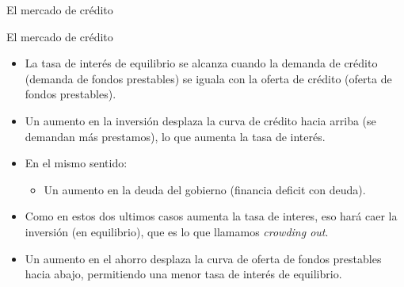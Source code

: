 \documentclass{beamer}
\begin{document}
\begin{frame}{El mercado de crédito}
    \begin{center}
        \begin{figure}[H]
        \renewcommand{\figurename}{Figure}
            \begin{center}
            \end{center}
        \end{figure}
    \end{center}  
\end{frame}

\begin{frame}{El mercado de crédito}
    \begin{itemize}
        \item La tasa de interés de equilibrio se alcanza cuando la demanda de crédito (demanda de fondos prestables) se iguala con la oferta de crédito (oferta de fondos prestables).
        \item Un aumento en la inversión desplaza la curva de crédito hacia arriba (se demandan más prestamos), lo que aumenta la tasa de interés.
        \item En el mismo sentido:
        \begin{itemize}
            \item Un aumento en la deuda del gobierno (financia deficit con deuda).
        \end{itemize}
        \item Como en estos dos ultimos casos aumenta la tasa de interes, eso hará caer la inversión (en equilibrio), que es lo que llamamos \textit{crowding out}.
        \item Un aumento en el ahorro desplaza la curva de oferta de fondos prestables hacia abajo, permitiendo una menor tasa de interés de equilibrio.
    \end{itemize}
    
\end{frame}
\end{document}
